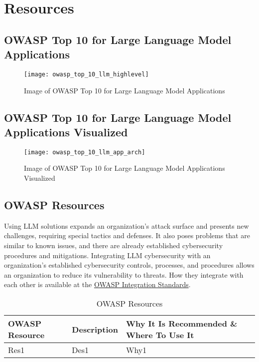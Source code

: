

\headerimage
\chapter{Resources}

\section{OWASP Top 10 for Large Language Model Applications}

\begin{figure}[ht]
  \centering
  \texttt{[image: owasp\_top\_10\_llm\_highlevel]}
  \caption{Image of OWASP Top 10 for Large Language Model Applications}
  \label{fig:owasp-top-10-llm-highlevel}
\end{figure}

\clearpage
\section{OWASP Top 10 for Large Language Model Applications Visualized}

\begin{figure}[ht]
  \centering
  \texttt{[image: owasp\_top\_10\_llm\_app\_arch]}
  \caption{Image of OWASP Top 10 for Large Language Model Applications Visualized}
  \label{fig:owasp-top-10-llm-visualized}
\end{figure}

\clearpage
\section{OWASP Resources}

Using LLM solutions expands an organization's attack surface and presents new
challenges, requiring special tactics and defenses. It also poses problems that
are similar to known issues, and there are already established cybersecurity
procedures and mitigations. Integrating LLM cybersecurity with an organization's
established cybersecurity controls, processes, and procedures allows an
organization to reduce its vulnerability to threats. How they integrate with
each other is available at the
\href{https://owasp.org/www-project-integration-standards/}{OWASP Integration Standards}.

\begin{table}[h]
\begin{tabularx}{\textwidth} {
  | >{\raggedright\arraybackslash}X
  | >{\raggedright\arraybackslash}X
  | >{\raggedright\arraybackslash}X | }
 \hline
    \textbf{OWASP Resource} & \textbf{Description} & \textbf{Why It Is Recommended \& Where To Use It}   \\
    \hline
    Res1 & Des1 & Why1  \\
    \hline
\end{tabularx}
\caption{OWASP Resources}
\label{tab:team}
\end{table}

